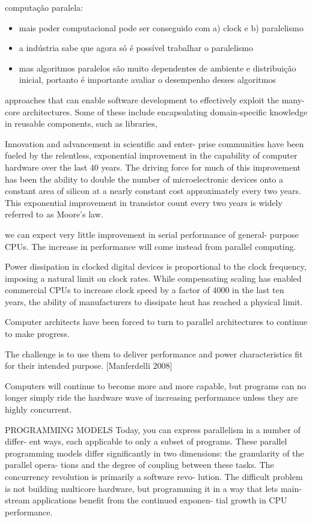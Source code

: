 computação paralela:
\begin{itemize}
\item mais poder computacional pode ser conseguido com a) clock  e b) paralelismo
\item a indústria sabe que agora só é possível trabalhar o paralelismo
\item mas algoritmos paralelos são muito dependentes de ambiente e distribuição inicial, portanto é importante avaliar o desempenho desses algoritmos
\end{itemize}

approaches that can enable software development to effectively exploit the many-core architectures. Some of these include encapsulating domain-specific knowledge in reusable components, such as libraries, 

Innovation and advancement in scientific and enter- prise communities have been fueled by the relentless, exponential improvement in the capability of computer hardware over the last 40 years. The driving force for much of this improvement has been the ability to double the number of microelectronic devices onto a constant area of silicon at a nearly constant cost approximately every two years. This exponential improvement in transistor count every two years is widely referred to as Moore’s law.

we can expect very little improvement in serial performance of general- purpose CPUs. The increase in performance will come instead from parallel computing. 

Power dissipation in clocked digital devices is proportional to the clock frequency, imposing a natural limit on clock rates. While compensating scaling has enabled commercial CPUs to increase clock speed by a factor of 4000 in the last ten years, the ability of manufacturers to dissipate heat has reached a physical limit. 

 Computer architects have been forced to turn to parallel architectures to continue to make progress.
 
 The challenge is to use them to deliver performance and power characteristics fit for their intended purpose.
 [Manferdelli 2008]
 
 
Computers will continue to become more and more capable, but programs can no longer simply ride the hardware wave of increasing performance unless they are highly concurrent. 
 
 PROGRAMMING MODELS
Today, you can express parallelism in a number of differ- ent ways, each applicable to only a subset of programs.
These parallel programming models differ significantly in two dimensions: the granularity of the parallel opera- tions and the degree of coupling between these tasks.
 The concurrency revolution is primarily a software revo- lution. The difficult problem is not building multicore hardware, but programming it in a way that lets main- stream applications benefit from the continued exponen- tial growth in CPU performance.
 
